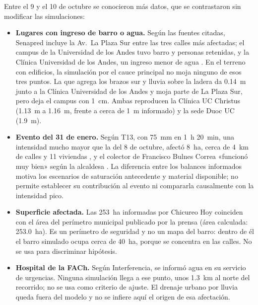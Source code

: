 Entre el 9 y el 10 de octubre se conocieron más datos, que se contrastaron sin modificar las simulaciones:
\begin{itemize}
\item \textbf{Lugares con ingreso de barro o agua.} Según las fuentes citadas, Senapred incluye la Av.\ La Plaza Sur entre las tres calles más afectadas; el campus de la Universidad de los Andes tuvo barro y personas retenidas, y la Clínica Universidad de los Andes, un ingreso menor de agua \citep{interferencia2026,cooperativa2026}. En el terreno con edificios, la simulación por el cauce principal no moja ninguno de esos tres puntos. La que agrega los brazos sur y lluvia sobre la ladera da \SI{0,14}{m} junto a la Clínica Universidad de los Andes y moja parte de La Plaza Sur, pero deja el campus con \SI{1}{cm}. Ambas reproducen la Clínica UC Christus (\SI{1,13}{m} a \SI{1,16}{m}, frente a cerca de \SI{1}{m} informado) y la sede Duoc UC (\SI{1,9}{m}).
\item \textbf{Evento del 31 de enero.} Según T13, con \SI{75}{mm} en \SI{1}{h} \SI{20}{min}, una intensidad mucho mayor que la del 8 de octubre, afectó \SI{8}{ha}, cerca de \SI{4}{km} de calles y 11 viviendas \citep{t13_2026mallas}, y el colector de Francisco Bulnes Correa «funcionó muy bien» según la alcaldesa \citep{latercera2026enero}. La diferencia entre los balances informados motiva los escenarios de saturación antecedente y material disponible; no permite establecer su contribución al evento ni compararla causalmente con la intensidad pico.
\item \textbf{Superficie afectada.} Las \SI{253}{ha} informadas por Chicureo Hoy \citep{chicureohoy2026} coinciden con el área del perímetro municipal publicado por la prensa (área calculada: \SI{253,0}{ha}). Es un perímetro de seguridad y no un mapa del barro: dentro de él el barro simulado ocupa cerca de \SI{40}{ha}, porque se concentra en las calles. No se usa para discriminar hipótesis.
\item \textbf{Hospital de la FACh.} Según Interferencia, se informó agua en su servicio de urgencias. Ninguna simulación llega a ese punto, unos \SI{1,3}{km} al norte del recorrido; no se usa como criterio de ajuste. El drenaje urbano por lluvia queda fuera del modelo y no se infiere aquí el origen de esa afectación.
\end{itemize}

